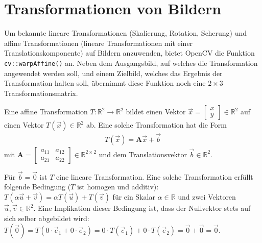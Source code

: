 \documentclass{whswinvcbook}
\begin{document}
\section{Transformationen von Bildern}
Um bekannte lineare Transformationen (Skalierung, Rotation, Scherung) und affine Transformationen (lineare Transformationen mit einer Translationskomponente) auf Bildern anzuwenden, bietet OpenCV die Funktion \texttt{cv::warpAffine()} an. Neben dem Ausgangsbild, auf welches die Transformation angewendet werden soll, und einem Zielbild, welches das Ergebnis der Transformation halten soll, übernimmt diese Funktion noch eine $2\times3$ Transformationsmatrix.

Eine affine Transformation $T:\mathbb{R}^2\rightarrow\mathbb{R}^2$ bildet einen Vektor $\vec{x}=\begin{bmatrix}x\\y\end{bmatrix}\in\mathbb{R}^2$ auf einen Vektor $T(\vec{x})\in\mathbb{R}^2$ ab. Eine solche Transformation hat die Form
\begin{gather*}
    T(\vec{x})=\mathbf{A}\vec{x}+\vec{b}
\end{gather*}
mit $\mathbf{A}=\begin{bmatrix}a_{11}&a_{12}\\a_{21}&a_{22}\end{bmatrix}\in\mathbb{R}^{2\times2}$ und dem Translationsvektor $\vec{b}\in\mathbb{R}^2$.

Für $\vec{b}=\vec{0}$ ist $T$ eine lineare Transformation. Eine solche Transformation erfüllt folgende Bedingung ($T$ ist homogen und additiv): $T(\alpha\vec{u}+\vec{v})=\alpha T(\vec{u})+T(\vec{v})$ für ein Skalar $\alpha\in\mathbb{R}$ und zwei Vektoren $\vec{u},\vec{v}\in\mathbb{R}^2$. Eine Implikation dieser Bedingung ist, dass der Nullvektor stets auf sich selber abgebildet wird: $T(\vec{0})=T(0\cdot\vec{e}_1+0\cdot\vec{e}_2)=0\cdot T(\vec{e}_1)+0\cdot T(\vec{e}_2)=\vec{0}+\vec{0}=\vec{0}$.
\end{document}
